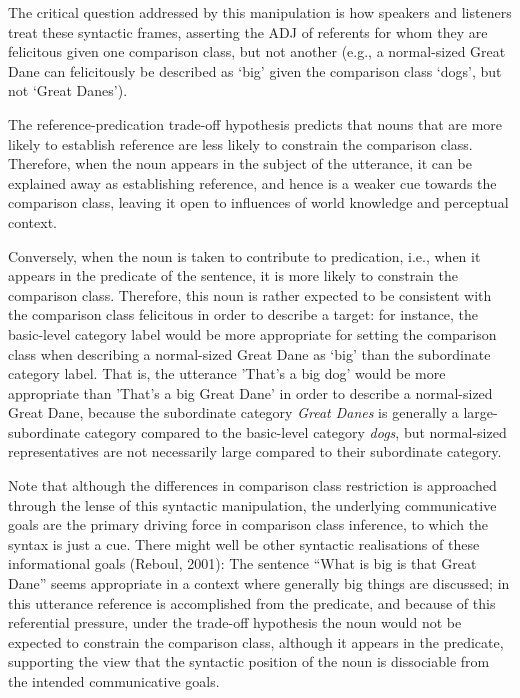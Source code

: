 The critical question addressed by this manipulation is how speakers and listeners treat these syntactic frames, asserting the ADJ of referents for whom they are felicitous given one comparison class, but not another (e.g., a normal-sized Great Dane can felicitously be described as ‘big’ given the comparison class ‘dogs’, but not ‘Great Danes’). 

The reference-predication trade-off hypothesis predicts that nouns that are more likely to establish reference are less likely to constrain the comparison class. Therefore, when the noun appears in the subject of the utterance, it can be explained away as establishing reference, and hence is a weaker cue towards the comparison class, leaving it open to influences of world knowledge and perceptual context. 

 Conversely, when the noun is taken to contribute to predication, i.e., when it appears in the predicate of the sentence, it is more likely to constrain the comparison class. Therefore, this noun is rather expected to be consistent with the comparison class felicitous in order to describe a target: for instance, the basic-level category label would be more appropriate for setting the comparison class when describing a normal-sized Great Dane as ‘big’ than the subordinate category label. That is, the utterance 'That's a big dog' would be more appropriate than 'That's a big Great Dane' in order to describe a normal-sized Great Dane, because the subordinate category \emph{Great Danes} is generally a large-subordinate category compared to the basic-level category \emph{dogs}, but normal-sized representatives are not necessarily large compared to their subordinate category. 

Note that although the differences in comparison class restriction is approached through the lense of this syntactic manipulation, the underlying communicative goals are the primary driving force in comparison class inference, to which the syntax is just a cue. 
There might well be other syntactic realisations of these informational goals (Reboul, 2001): The sentence “What is big is that Great Dane” seems appropriate in a context where generally big things are discussed; in this utterance reference is accomplished from the predicate, and because of this referential pressure, under the trade-off hypothesis the noun would not be expected to constrain the comparison class, although it appears in the predicate, supporting the view that the syntactic position of the noun is dissociable from the intended communicative goals.


